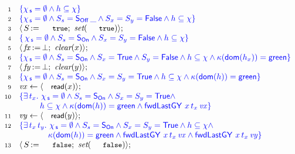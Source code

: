 \begin{figure}[!htp]
\[
  \begin{array}[t]{r l}
  \num{1} & \specK{\{ \histS = \hempty \wedge h \subseteq \hist \}} \\
  \num{2} & \specK{\{ \histS = \hempty \wedge
                \sss = \sOff\, \_ \wedge \sx = \sy = \FF
                \wedge h \subseteq \hist\}}\\
  \num{3} & \lat\,\actwrite{\s}{\esc{true}};\ \aux{set}(\esc{true}) \rat;\\
  \num{4} & \specK{\{\, \histS = \hempty \wedge
              \sss = \sOn \wedge \sx = \sy = \FF \wedge
              h \subseteq \hist \}}\\
  \num{5} & \lat\,\actwrite{\var{\fx}}{\bot};\ \aux{clear}(x)\rat;\\
  \num{6} & \specK{\{
                 \histS = \hempty \wedge \sss= \sOn \wedge \sx = \TT
                 \wedge \sy = \FF \wedge
               h \subseteq \hist \wedge
               \C(\dom{h_{x}}) = \mathsf{green}\}}\\
  \num{7} & \lat\,\actwrite{\var{\fy}}{\bot};\ \aux{clear}(y)\rat;\\
  \num{8} & \specK{\{\histS = \hempty \wedge \sss= \sOn \wedge
             \sx = \sy = \TT \wedge
             h \subseteq \hist \wedge \C(\dom{h}) = \mathsf{green}\}}\\
  \num{9} & \var{vx} \tbnd \lat \act{read}(x) \rat;\\
  \num{10} & \specK{\{ \exists\, t_x\ldot\, \histS = \hempty \wedge
                  \sss = \sOn \wedge \sx = \sy = \TT  \wedge}\\
           & \specK{\hphantom{\{ \exists\, t_x\ldot}
                h \subseteq \hist \wedge \C(\dom{h}) = \mathsf{green} \wedge    
                \botLGY\ x\, t_x\, \var{vx} \}} \\
  \num{11} & \var{vy} \tbnd \lat \act{read}(y) \rat;\\
  \num{12} & \specK{\{ \exists\, t_x\, t_y\ldot\, \histS = \hempty \wedge
              \sss = \sOn \wedge \sx = \sy = \TT  \wedge
              h \subseteq \hist \wedge}\\
           & \specK{\hphantom{\{ \exists\, t_x \, t_y\ldot}
             \C(\dom{h}) = \mathsf{green} \wedge    
            \botLGY\ x\, t_x\, \var{vx} \wedge \botLGY\ x\, t_x\, \var{vy}\}} \\
  \num{13} &\lat\,\actwrite{\s}{\esc{false}};\ \aux{set}(\esc{false}) \rat;\\\

\end{array}\]
\end{figure}
